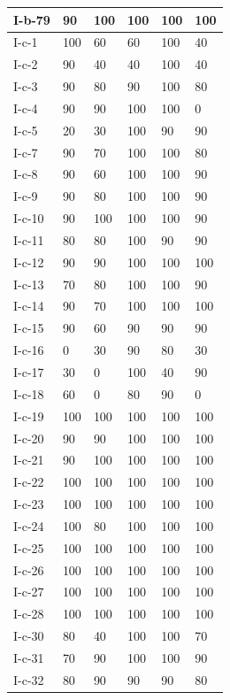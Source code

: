 \documentclass[11pt,a4paper]{article}
\begin{document}
\begin{table}[h]
\begin{tabular}{|l|l|l|l|l|l|}
I-b-79 & 90 & 100 & 100 & 100 & 100 \\ \hline
I-c-1 & 100 & 60 & 60 & 100 & 40 \\ \hline
I-c-2 & 90 & 40 & 40 & 100 & 40 \\ \hline
I-c-3 & 90 & 80 & 90 & 100 & 80 \\ \hline
I-c-4 & 90 & 90 & 100 & 100 & 0 \\ \hline
I-c-5 & 20 & 30 & 100 & 90 & 90 \\ \hline
I-c-7 & 90 & 70 & 100 & 100 & 80 \\ \hline
I-c-8 & 90 & 60 & 100 & 100 & 90 \\ \hline
I-c-9 & 90 & 80 & 100 & 100 & 90 \\ \hline
I-c-10 & 90 & 100 & 100 & 100 & 90 \\ \hline
I-c-11 & 80 & 80 & 100 & 90 & 90 \\ \hline
I-c-12 & 90 & 90 & 100 & 100 & 100 \\ \hline
I-c-13 & 70 & 80 & 100 & 100 & 90 \\ \hline
I-c-14 & 90 & 70 & 100 & 100 & 100 \\ \hline
I-c-15 & 90 & 60 & 90 & 90 & 90 \\ \hline
I-c-16 & 0 & 30 & 90 & 80 & 30 \\ \hline
I-c-17 & 30 & 0 & 100 & 40 & 90 \\ \hline
I-c-18 & 60 & 0 & 80 & 90 & 0 \\ \hline
I-c-19 & 100 & 100 & 100 & 100 & 100 \\ \hline
I-c-20 & 90 & 90 & 100 & 100 & 100 \\ \hline
I-c-21 & 90 & 100 & 100 & 100 & 100 \\ \hline
I-c-22 & 100 & 100 & 100 & 100 & 100 \\ \hline
I-c-23 & 100 & 100 & 100 & 100 & 100 \\ \hline
I-c-24 & 100 & 80 & 100 & 100 & 100 \\ \hline
I-c-25 & 100 & 100 & 100 & 100 & 100 \\ \hline
I-c-26 & 100 & 100 & 100 & 100 & 100 \\ \hline
I-c-27 & 100 & 100 & 100 & 100 & 100 \\ \hline
I-c-28 & 100 & 100 & 100 & 100 & 100 \\ \hline
I-c-30 & 80 & 40 & 100 & 100 & 70 \\ \hline
I-c-31 & 70 & 90 & 100 & 100 & 90 \\ \hline
I-c-32 & 80 & 90 & 90 & 90 & 80 \\ \hline

\end{tabular}
\end{table}
\end{document}
